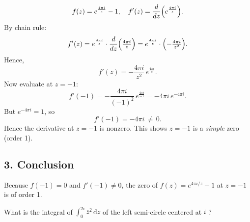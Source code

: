 \documentclass[12pt]{article}
\theoremstyle{definition} %
\theoremstyle{plain} %
\begin{document}
\[
f(z) 
= e^{\frac{4\pi i}{z}} - 1,
\quad
f'(z) 
= \frac{d}{dz}\Bigl(e^{\frac{4\pi i}{z}}\Bigr).
\]
By chain rule:
\[
f'(z)
= e^{\frac{4\pi i}{z}} 
  \cdot \frac{d}{dz}\Bigl(\tfrac{4\pi i}{z}\Bigr)
= e^{\frac{4\pi i}{z}} \cdot \Bigl(-\tfrac{4\pi i}{z^2}\Bigr).
\]
Hence,
\[
f'(z) 
= -\frac{4\pi i}{z^2}\, e^{\frac{4\pi i}{z}}.
\]
Now evaluate at $z=-1$:
\[
f'(-1)
= -\frac{4\pi i}{(-1)^2} \, e^{\frac{4\pi i}{-1}}
= -4\pi i \, e^{-4\pi i}.
\]
But $e^{-4\pi i}=1$, so
\[
f'(-1) 
= -4\pi i \,\neq\, 0.
\]
Hence the derivative at $z=-1$ is nonzero.  This shows $z=-1$ is a \emph{simple} zero (order 1).

\subsection*{3. Conclusion}

Because $f(-1)=0$ and $f'(-1)\neq0$, the zero of $f(z)=e^{4\pi i/z}-1$ at $z=-1$ is of order 1.

What is the integral of $\int_{0}^{2i} \overline{z}^{2} \,\mathrm{d}z $ of the left semi-circle centered at $i$ ? 
\end{document}
